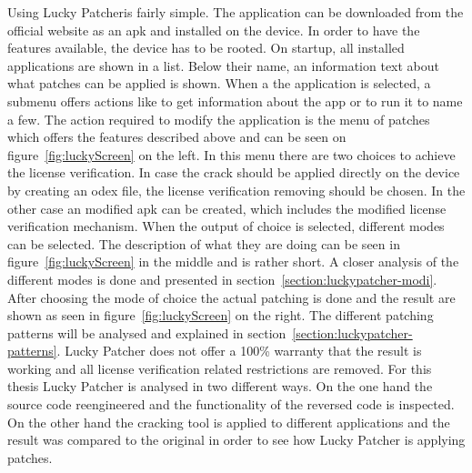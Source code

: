 Using Lucky Patcheris fairly simple.
The application can be downloaded from the official website \cite{luckyPatcherOfficial} as an \gls{apk} and installed on the device.
In order to have the features available, the device has to be rooted.
On startup, all installed applications are shown in a list.
Below their name, an information text about what patches can be applied is shown.
When a the application is selected, a submenu offers actions like to get information about the app or to run it to name a few.
The action required to modify the application is the menu of patches which offers the features described above and can be seen on figure~\ref{fig:luckyScreen} on the left.
In this menu there are two choices to achieve the license verification.
In case the crack should be applied directly on the device by creating an odex file, the license verification removing should be chosen.
In the other case an modified apk can be created, which  includes the modified license verification mechanism.
When the output of choice is selected, different modes can be selected.
The description of what they are doing can be seen in figure~\ref{fig:luckyScreen} in the middle and is rather short.
A closer analysis of the different modes is done and presented in section~\ref{section:luckypatcher-modi}.
After choosing the mode of choice the actual patching is done and the result are shown as seen in figure~\ref{fig:luckyScreen} on the right.
The different patching patterns will be analysed and explained in section~\ref{section:luckypatcher-patterns}.
Lucky Patcher does not offer a 100\% warranty that the result is working and all license verification related restrictions are removed.
\newline
For this thesis Lucky Patcher is analysed in two different ways.
On the one hand the source code reengineered and the functionality of the reversed code is inspected.
On the other hand the cracking tool is applied to different applications and the result was compared to the original in order to see how Lucky Patcher is applying patches.


